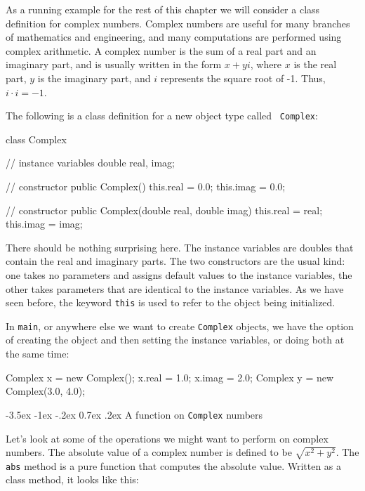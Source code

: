 \documentclass{book}
\makeatletter
\renewcommand{\section}{\@startsection 
    {section} {1} {0mm}%
    {-3.5ex \@plus -1ex \@minus -.2ex}%
    {0.7ex \@plus.2ex}%
    {\normalfont\Large\bfseries}}
\makeatother
\begin{document}
As a running example for the rest of this chapter we will consider a
class definition for complex numbers.  Complex numbers are useful for
many branches of mathematics and engineering, and many computations
are performed using complex arithmetic.  A complex number is the sum
of a real part and an imaginary part, and is usually written in the
form $x + yi$, where $x$ is the real part, $y$ is the imaginary part,
and $i$ represents the square root of -1.
Thus, $i \cdot i = -1$.

The following is a class definition for a new object type called {\tt
Complex}:

\begin{verbatimtab}
class Complex
{
    // instance variables
    double real, imag;

    // constructor
    public Complex() {
        this.real = 0.0;  this.imag = 0.0;
    }
	
    // constructor
    public Complex(double real, double imag) {
        this.real = real;  
        this.imag = imag;
    }
}
\end{verbatimtab}
%
There should be nothing surprising here.  The instance variables
are doubles that contain the real and imaginary parts.
The two constructors are the usual kind: one takes no parameters
and assigns default values to the instance variables, the other
takes parameters that are identical to the instance variables.
As we have seen before, the keyword {\tt this} is used to refer
to the object being initialized.


In {\tt main}, or anywhere else we want to create {\tt Complex}
objects, we have the option of creating the object and then
setting the instance variables, or doing both at the same time:

\begin{verbatimtab}
    Complex x = new Complex();
    x.real = 1.0;
    x.imag = 2.0;
    Complex y = new Complex(3.0, 4.0);
\end{verbatimtab}


\section{A function on {\tt Complex} numbers}

Let's look at some of the operations we might want to perform
on complex numbers.  The absolute value of a complex number is
defined to be $\sqrt {x^2 + y^2}$.  The {\tt abs} method is
a pure function that computes the absolute value.  Written as
a class method, it looks like this:
\end{document}
